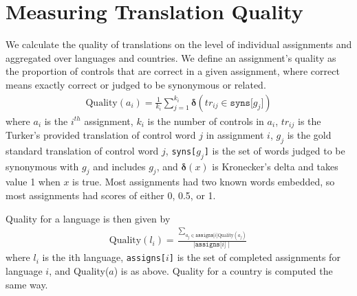 \documentclass[11pt]{article}
\begin{document}
\section{Measuring Translation Quality}

We calculate the quality of translations on the level of individual assignments and aggregated over languages and countries.  We define an assignment's quality as the proportion of controls that are correct in a given assignment, where correct means exactly correct or judged to be synonymous or related.
\begin{align}	
	\text{Quality}(a_i) = \frac{1}{k_i}\sum\limits_{j=1}^{k_i}\mathbf{\delta}(tr_{ij} \in \texttt{syns[$g_j$]})
\end{align}	
where $a_i$ is the $i^{th}$ assignment, $k_i$ is the number of controls in $a_i$, $tr_{ij}$ is the Turker's provided translation of control word $j$ in assignment $i$, $g_j$ is the gold standard translation of control word $j$, \texttt{syns[$g_j$]} is the set of words judged to be synonymous with $g_j$ and includes $g_j$, and $\mathbf{\delta}(x)$ is Kronecker's delta and takes value 1 when $x$ is true. 
Most assignments had two known words embedded, so most assignments had scores of either 0, 0.5, or 1. 

%

Quality for a language is then given by
\begin{align}	
	\text{Quality}(l_i) = \frac{\sum_{a_j \in \texttt{assigns[$i$]}\text{Quality}(a_j)}}{\mid \texttt{assigns[$i$]} \mid}
\end{align}	
where $l_i$ is the ith language, \texttt{assigns[$i$]} is the set of completed assignments for language $i$, and Quality($a$) is as above. Quality for a country is computed the same way.

\end{document}
